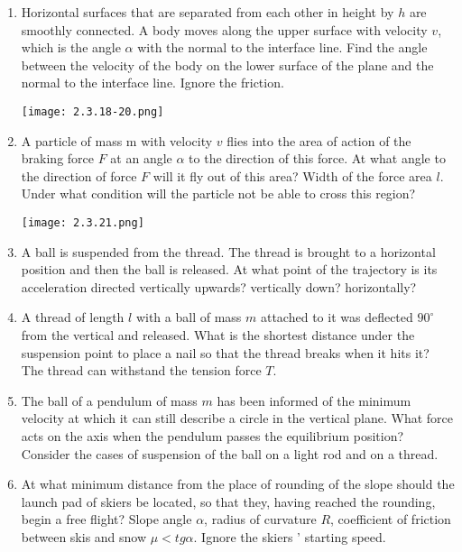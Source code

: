 \documentclass{article}
\begin{document}
\begin{enumerate}[label=2.3.\arabic*]
\item Horizontal surfaces that are separated from each other in height by $h$ are smoothly connected. A body moves along the upper surface with velocity $v$, which is the angle $\alpha$ with the normal to the interface line. Find the angle between the velocity of the body on the lower surface of the plane and the normal to the interface line. Ignore the friction.

\begin{center}
    \texttt{[image: 2.3.18-20.png]}
\end{center}


\item A particle of mass m with velocity $v$ flies into the area of action of the braking force $F$ at an angle $\alpha$ to the direction of this force. At what angle to the direction of force $F$ will it fly out of this area? Width of the force area $l$. Under what condition will the particle not be able to cross this region?

\begin{center}
    \texttt{[image: 2.3.21.png]}
\end{center}


\item A ball is suspended from the thread. The thread is brought to a horizontal position and then the ball is released. At what point of the trajectory is its acceleration directed vertically upwards? vertically down? horizontally?

\item A thread of length $l$ with a ball of mass $m$ attached to it was deflected $90^\circ$ from the vertical and released. What is the shortest distance under the suspension point to place a nail so that the thread breaks when it hits it? The thread can withstand the tension force $T$.

\item The ball of a pendulum of mass $m$ has been informed of the minimum velocity at which it can still describe a circle in the vertical plane. What force acts on the axis when the pendulum passes the equilibrium position? Consider the cases of suspension of the ball on a light rod and on a thread.

\item At what minimum distance from the place of rounding of the slope should the launch pad of skiers be located, so that they, having reached the rounding, begin a free flight? Slope angle $\alpha$, radius of curvature $R$, coefficient of friction between skis and snow $\mu < tg \alpha$. Ignore the skiers ' starting speed.


\end{enumerate}
\end{document}
